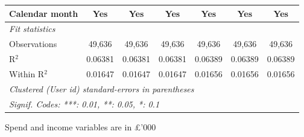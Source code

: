 \begin{table}[htbp]
\begin{threeparttable}[b]
\begin{tabular}{lcccccc}
         Calendar month      & Yes            & Yes            & Yes            & Yes            & Yes            & Yes\\  
         \midrule
         \emph{Fit statistics}\\
         Observations        & 49,636         & 49,636         & 49,636         & 49,636         & 49,636         & 49,636\\  
         R$^2$               & 0.06381        & 0.06381        & 0.06381        & 0.06389        & 0.06389        & 0.06389\\  
         Within R$^2$        & 0.01647        & 0.01647        & 0.01647        & 0.01656        & 0.01656        & 0.01656\\  
         \midrule \midrule
         \multicolumn{7}{l}{\emph{Clustered (User id) standard-errors in parentheses}}\\
         \multicolumn{7}{l}{\emph{Signif. Codes: ***: 0.01, **: 0.05, *: 0.1}}\\
      \end{tabular}
      
      \begin{tablenotes}\footnotesize
         \item Spend and income variables are in £'000
      \end{tablenotes}
   \end{threeparttable}
\end{table}


